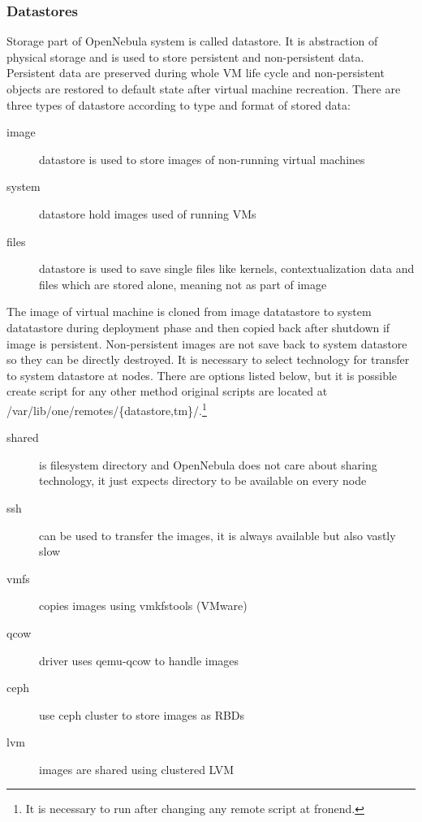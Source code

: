 \subsubsection{Datastores}
Storage part of OpenNebula system is called datastore. It is abstraction of physical storage and is used to store persistent and non-persistent data. Persistent data are preserved during whole \Ac{VM} life cycle and non-persistent objects are restored to default state after virtual machine recreation. There are three types of datastore according to type and format of stored data:
\begin{description}
	\item[image] datastore is used to store images of non-running virtual machines
	\item[system] datastore hold images used of running \Ac{VM}s
	\item[files] datastore is used to save single files like kernels, contextualization data and files which are stored alone, meaning not as part of image
\end{description}

The image of virtual machine is cloned from image datatastore to system datatastore during deployment phase and then copied back after shutdown if image is persistent. Non-persistent images are not save back to system datastore so they can be directly destroyed. It is necessary to select technology for transfer to system datastore at nodes. There are options listed below, but it is possible create script for any other method original scripts are located at /var/lib/one/remotes/\{datastore,tm\}/.\footnote{It is necessary to run  after changing any remote script at fronend.}
\begin{description}
	\item[shared] is filesystem directory and OpenNebula does not care about sharing technology, it just expects directory to be available on every node
	\item[ssh] can be used to transfer the images, it is always available but also vastly slow
	\item[vmfs] copies images using vmkfstools (VMware)
	\item[qcow] driver uses qemu-qcow to handle images
	\item[ceph] use ceph cluster to store images as \Ac{RBD}s
	\item[lvm] images are shared using clustered LVM
\end{description}


